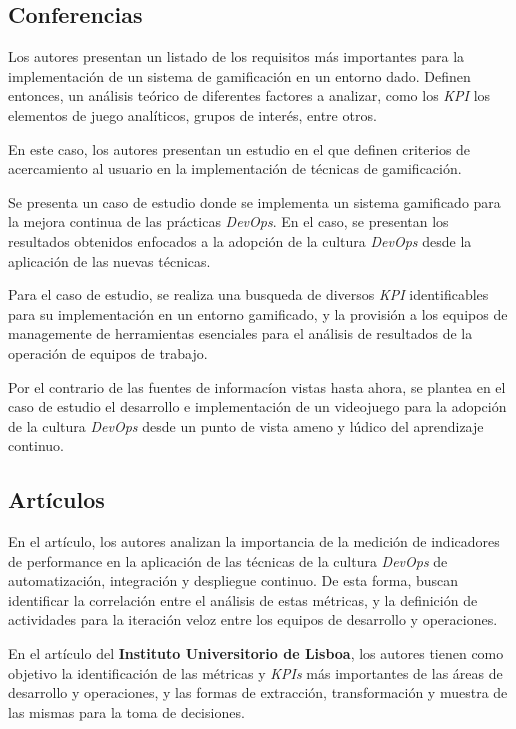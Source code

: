\documentclass[journal]{IEEEtran}
\begin{document}
\subsection{\textbf{ \textbf{\large Conferencias}}}

\cite{heilbrunn2014towards} Los autores presentan un listado de los requisitos más importantes para la implementación de un sistema de gamificación en un entorno dado. Definen entonces, un análisis teórico de diferentes factores a analizar, como los \textit{KPI} los elementos de juego analíticos, grupos de interés, entre otros.

\cite{meng2014gamification} En este caso, los autores presentan un estudio en el que definen criterios de acercamiento al usuario en la implementación de técnicas de gamificación.

\cite{ayoup2022achievement} Se presenta un caso de estudio donde se implementa un sistema gamificado para la mejora continua de las prácticas \textit{DevOps}. En el caso, se presentan los resultados obtenidos enfocados a la adopción de la cultura \textit{DevOps} desde la aplicación de las nuevas técnicas.

\cite{palenvcarova2022goal} Para el caso de estudio, se realiza una busqueda de diversos \textit{KPI} identificables para su implementación en un entorno gamificado, y la provisión a los equipos de managemente de herramientas esenciales para el análisis de resultados de la operación de equipos de trabajo.

\cite{grande2023serious} Por el contrario de las fuentes de informacíon vistas hasta ahora, se plantea en el caso de estudio el desarrollo e implementación de un videojuego para la adopción de la cultura \textit{DevOps} desde un punto de vista ameno y lúdico del aprendizaje continuo.

\subsection{\textbf{ \textbf{\large Artículos}}}

\cite{brunnert2015performance} En el artículo, los autores analizan la importancia de la medición de indicadores de performance en la aplicación de las técnicas de la cultura \textit{DevOps} de automatización, integración y despliegue continuo. De esta forma, buscan identificar la correlación entre el análisis de estas métricas, y la definición de actividades para la iteración veloz entre los equipos de desarrollo y operaciones.

\cite{amaro2024devops} En el artículo del \textbf{Instituto Universitorio de Lisboa}, los autores tienen como objetivo la identificación de las métricas y \textit{KPIs} más importantes de las áreas de desarrollo y operaciones, y las formas de extracción, transformación y muestra de las mismas para la toma de decisiones.
\end{document}
